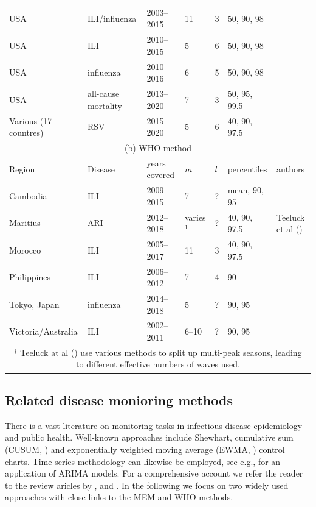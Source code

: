 \documentclass[12pt]{article}
\begin{document}
\begin{table}[h!]
\begin{tabular}{l l l l l l l}
USA & ILI/influenza & 2003--2015 & 11 & 3 & 50, 90, 98 & \cite{Biggerstaff2017}\\
USA & ILI & 2010--2015 & 5 & 6 & 50, 90, 98 & \cite{Dahlgren2018}\\
USA & influenza & 2010--2016 & 6 & 5 & 50, 90, 98 & \cite{Dahlgren2019}\\
USA & all-cause mortality & 2013--2020 & 7 & 3 & 50, 95, 99.5 & \cite{Dahlgren2022}\\
Various (17 countres) & RSV & 2015--2020 & 5 & 6 & 40, 90, 97.5 & \cite{Wang2023} \\ %
\midrule 
\multicolumn{7}{c}{(b) WHO method}\\
\toprule
Region & Disease & years covered & $m$ & $l$ & percentiles & authors\\
\midrule
Cambodia & ILI & 2009--2015 & 7 & ? & mean, 90, 95 & \cite{Ly2017}\\
Maritius & ARI & 2012--2018 & varies$^1$ & ? & 40, 90, 97.5 & Teeluck et al (\citeyear{Teeluck2021}) \\
Morocco & ILI & 2005--2017 & 11 & 3 & 40, 90, 97.5 & \cite{Rguig2020}\\
Philippines & ILI & 2006--2012 & 7 & 4 & 90 & \cite{Lucero2016}\\
Tokyo, Japan & influenza & 2014--2018 & 5 & ? & 90, 95 & \cite{Matsuda2022} \\
Victoria/Australia & ILI & 2002--2011 & 6--10 & ? & 90, 95 & \cite{Tay2013}\\
\bottomrule
\multicolumn{7}{c}{$^\dagger$ Teeluck at al (\citeyear{Teeluck2021}) use various methods to split up multi-peak seasons, leading to different effective numbers of waves used.}\\ 
\end{tabular}
\end{table}


\subsection{Related disease monioring methods}
\label{sec:related_literature}


There is a vast literature on monitoring tasks in infectious disease epidemiology and public health. Well-known approaches include Shewhart, cumulative sum (CUSUM, \citealt{Hoehle2008}) and exponentially weighted moving average (EWMA, \citealt{Steiner2010}) control charts. Time series methodology can likewise be employed, see e.g., \cite{Reis2003} for an application of ARIMA models. For a comprehensive account we refer the reader to the review aricles by \cite{Allevius2020}, \cite{Rigdon2015} and \cite{Unkel2012}. In the following we focus on two widely used approaches with close links to the MEM and WHO methods.
\end{document}
